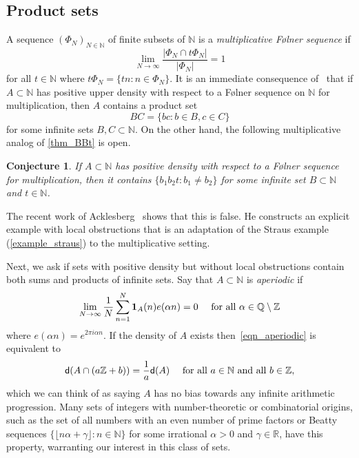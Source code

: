 \documentclass[10pt,dvipsnames]{article}
\newtheorem{conjecture}[theorem]{Conjecture}
\theoremstyle{definition}
\theoremstyle{plain}
\newcommand{\define}[1]{\textit{#1}}
\newcommand{\R}{\mathbb{R}}
\newcommand{\Z}{\mathbb{Z}}
\newcommand{\Q}{\mathbb{Q}}
\newcommand{\N}{\mathbb{N}}
\newcommand{\dens}{\mathsf{d}}
\newcommand{\Folner}{F\o{}lner}
\newcommand{\one}{\boldsymbol{1}}
\begin{document}
\subsection{Product sets}


A sequence $(\Phi_N)_{N \in \N}$ of finite subsets of $\N$ is a \define{multiplicative \Folner{} sequence} if 
\[
\lim_{N \to \infty} \dfrac{|\Phi_N \cap t\Phi_N|}{|\Phi_N|} = 1
\]
for all $t \in \N$ where $t \Phi_N  = \{ tn  : n \in \Phi_N \}$.
It is an immediate consequence of~\cite[Theorem~1.3]{MRR} that if $A \subset \N$ has positive upper density with respect to a \Folner{} sequence on $\N$ for multiplication, then $A$ contains a product set 
\[
BC = \{ bc : b \in B, c \in C \}
\]
for some  infinite sets $B,C \subset \N$.
On the other hand, the following multiplicative analog of \cref{thm_BBt} is open.

\begin{conjecture}
If $A \subset \N$ has positive density with respect to a \Folner{} sequence for multiplication, then it contains $\{b_1b_2t:b_1\neq b_2\}$ for some infinite set $B \subset \N$ and $t\in\N$.
\end{conjecture}

The recent work of Acklesberg~\cite[Theorem 1.4]{ackelsberg} shows that this is false. He constructs an explicit example with local obstructions that is an adaptation  of the Straus example (\cref{example_straus}) to the multiplicative setting.

Next, we ask if sets with positive density but without local obstructions contain both sums and products of infinite sets. 
Say that $A\subset\N$ is \define{aperiodic} if 
\begin{equation}
\label{eqn_aperiodic}
\lim_{N\to\infty} \frac{1}{N}\sum_{n=1}^N \one_A(n)e(\alpha n) =0 \quad\textup{ for all } \alpha\in\Q\setminus\Z
\end{equation}
where $e(\alpha n) = e^{2 \pi i \alpha n}$.
If the density of $A$ exists then~\eqref{eqn_aperiodic} is equivalent to 
\[
\dens(A\cap (a\Z+b))=\frac{1}{a}\dens(A) \quad\textup{ for all } a\in\N \textup{ and all } b\in\Z,
\]
which we can think of as saying $A$ has no bias towards any infinite arithmetic progression. 
Many sets of integers with number-theoretic or combinatorial origins, such as the set of all numbers with an even number of prime factors or Beatty sequences $\{\lfloor n\alpha+\gamma\rfloor:n\in\N\}$ for some irrational $\alpha > 0$ and $\gamma \in\R$, have this property, warranting our interest in this class of sets.
\end{document}
